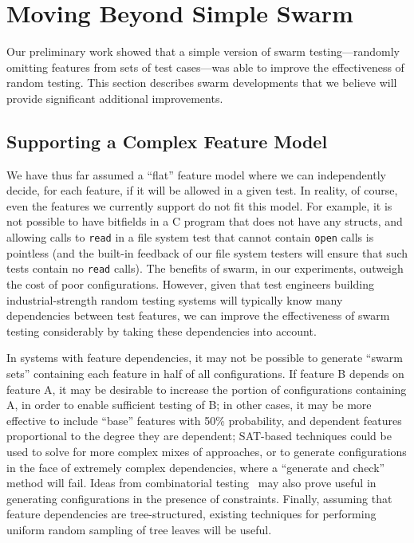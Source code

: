 \section{Moving Beyond Simple Swarm}
\label{sec:advswarm}

Our preliminary work showed that a simple version of swarm
testing---randomly omitting features from sets of test cases---was
able to improve the effectiveness of random testing.
%
This section describes swarm developments that we believe will provide
significant additional improvements.


\subsection{Supporting a Complex Feature Model}

We have thus far assumed a ``flat'' feature model where we can
independently decide, for each feature, if it will be allowed in a
given test.
%
In reality, of course, even the features we currently support do not
fit this model.  
%
For example, it is not possible to have bitfields in a C program that
does not have any structs, and allowing calls to {\tt read} in a
file system test that cannot contain {\tt open} calls is pointless
(and the built-in feedback of our file system testers will ensure that
such tests contain no {\tt read} calls).  The benefits of
swarm, in our experiments, outweigh the cost of poor configurations.
However, given that test engineers building industrial-strength random
testing systems will typically know many dependencies between test
features, we can improve the effectiveness of swarm testing
considerably by taking these dependencies into account.

In systems with feature dependencies, it may not be possible to
generate ``swarm sets'' containing each feature in half of all
configurations.  If feature B depends on feature A, it may be
desirable to increase the portion of configurations containing A, in
order to enable sufficient testing of B; in other cases, it may be
more effective to include ``base'' features with 50\% probability, and
dependent features proportional to the degree they are dependent;
SAT-based techniques could be used to solve for more complex mixes of
approaches, or to generate configurations in the face of extremely
complex dependencies, where a ``generate and check'' method will fail.
Ideas from combinatorial testing~\cite{combin} may also prove useful
in generating configurations in the presence of constraints.
%
Finally, assuming that feature dependencies are tree-structured,
existing techniques for performing uniform random sampling of tree
leaves will be useful.



